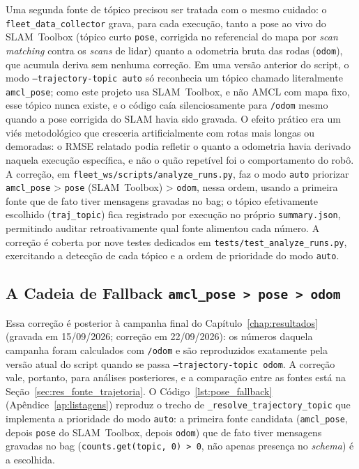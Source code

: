 Uma segunda fonte de tópico precisou ser tratada com o mesmo cuidado: o
\texttt{fleet\_\allowbreak data\_\allowbreak collector} grava, para cada execução, tanto a pose ao vivo
do SLAM~Toolbox \cite{macenski2021slam} (tópico curto \texttt{pose}, corrigida no referencial do mapa por
\textit{scan matching} contra os \textit{scans} de lidar) quanto a odometria
bruta das rodas (\texttt{odom}), que acumula deriva sem nenhuma correção. Em uma
versão anterior do script, o modo \texttt{--\allowbreak trajectory-\allowbreak topic auto} só
reconhecia um tópico chamado literalmente \texttt{amcl\_\allowbreak pose}; como este projeto
usa SLAM~Toolbox, e não AMCL com mapa fixo, esse tópico nunca existe, e o
código caía silenciosamente para \texttt{/odom} mesmo quando a pose corrigida do
SLAM havia sido gravada. O efeito prático era um viés metodológico que
cresceria artificialmente com rotas mais longas ou demoradas: o RMSE
relatado podia refletir o quanto a odometria havia derivado naquela execução
específica, e não o quão repetível foi o comportamento do robô. A correção,
em \texttt{fleet\_\allowbreak ws/\allowbreak scripts/\allowbreak analyze\_\allowbreak runs.py}, faz o modo \texttt{auto} priorizar
\texttt{amcl\_\allowbreak pose} > \texttt{pose} (SLAM~Toolbox) > \texttt{odom}, nessa ordem, usando a
primeira fonte que de fato tiver mensagens gravadas no bag; o tópico
efetivamente escolhido (\texttt{traj\_\allowbreak topic}) fica registrado por execução no
próprio \texttt{summary.json}, permitindo auditar retroativamente qual fonte
alimentou cada número. A correção é coberta por nove testes dedicados em
\texttt{tests/\allowbreak test\_\allowbreak analyze\_\allowbreak runs.py}, exercitando a detecção de cada tópico e
a ordem de prioridade do modo \texttt{auto}.

\subsection{A Cadeia de Fallback \texttt{amcl\_pose > pose > odom}}
\label{sec:impl_fallback_pose}

Essa correção é posterior à campanha final do Capítulo~\ref{chap:resultados}
(gravada em 15/09/2026; correção em 22/09/2026): os números daquela campanha
foram calculados com \texttt{/\allowbreak odom} e são reproduzidos exatamente pela
versão atual do script quando se passa \texttt{--\allowbreak trajectory-\allowbreak topic odom}.
A correção vale, portanto, para análises posteriores, e a comparação entre as
fontes está na Seção~\ref{sec:res_fonte_trajetoria}. O Código~\ref{lst:pose_fallback}
(Apêndice~\ref{ap:listagens}) reproduz o trecho de \texttt{\_\allowbreak resolve\_\allowbreak trajectory\_\allowbreak topic} que implementa a
prioridade do modo \texttt{auto}: a primeira fonte candidata (\texttt{amcl\_\allowbreak pose},
depois \texttt{pose} do SLAM~Toolbox, depois \texttt{odom}) que de fato tiver
mensagens gravadas no bag (\texttt{counts.\allowbreak get(topic, 0) > 0}, não apenas presença
no \textit{schema}) é a escolhida.


